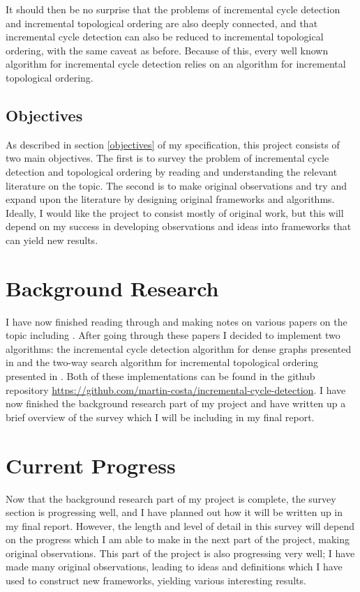 \documentclass{article}
\begin{document}
It should then be no surprise that the problems of incremental cycle detection and incremental topological ordering are also deeply connected, and that incremental cycle detection can also be reduced to incremental topological ordering, with the same caveat as before. Because of this, every well known algorithm for incremental cycle detection relies on an algorithm for incremental topological ordering.

\subsection{Objectives}

As described in section \ref{objectives} of my specification, this project consists of two main objectives. The first is to survey the problem of incremental cycle detection and topological ordering by reading and understanding the relevant literature on the topic. The second is to make original observations and try and expand upon the literature by designing original frameworks and algorithms. Ideally, I would like the project to consist mostly of original work, but this will depend on my success in developing observations and ideas into frameworks that can yield new results.

\section{Background Research}

I have now finished reading through and making notes on various papers on the topic including \cite{BenderFG09, HaeuplerKMST12, BernsteinC18, BhattacharyaK20}. After going through these papers I decided to implement two algorithms: the incremental cycle detection algorithm for dense graphs presented in \cite{BenderFG09} and the two-way search algorithm for incremental topological ordering presented in \cite{HaeuplerKMST12}. Both of these implementations can be found in the github repository \url{https://github.com/martin-costa/incremental-cycle-detection}. I have now finished the background research part of my project and have written up a brief overview of the survey which I will be including in my final report.

\section{Current Progress}

Now that the background research part of my project is complete, the survey section is progressing well, and I have planned out how it will be written up in my final report. However, the length and level of detail in this survey will depend on the progress which I am able to make in the next part of the project, making original observations. This part of the project is also progressing very well; I have made many original observations, leading to ideas and definitions which I have used to construct new frameworks, yielding various interesting results.
\end{document}
